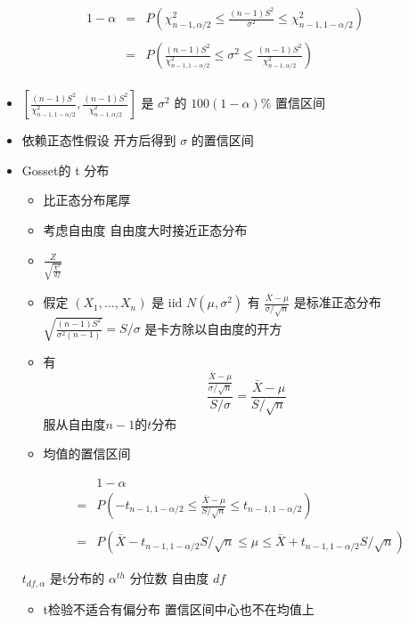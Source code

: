 \documentclass[]{book}
\providecommand{\tightlist}{%
  \setlength{\itemsep}{0pt}\setlength{\parskip}{0pt}}
\begin{document}
\begin{eqnarray*}
  1 - \alpha & = & P \left( \chi^2_{n-1, \alpha/2} \leq  \frac{(n - 1) S^2}{\sigma^2} \leq  \chi^2_{n-1,1 - \alpha/2} \right) \\ \\
& = &  P\left(\frac{(n-1)S^2}{\chi^2_{n-1,1-\alpha/2}} \leq \sigma^2 \leq 
\frac{(n-1)S^2}{\chi^2_{n-1,\alpha/2}} \right) \\
\end{eqnarray*}

\begin{itemize}
\tightlist
\item
  \(\left[\frac{(n-1)S^2}{\chi^2_{n-1,1-\alpha/2}}, \frac{(n-1)S^2}{\chi^2_{n-1,\alpha/2}}\right]\) 是 \(\sigma^2\) 的 \(100(1-\alpha)\%\) 置信区间
\item
  依赖正态性假设 开方后得到 \(\sigma\) 的置信区间
\item
  Gosset的 t 分布

  \begin{itemize}
  \tightlist
  \item
    比正态分布尾厚
  \item
    考虑自由度 自由度大时接近正态分布
  \item
    \(\frac{Z}{\sqrt{\frac{\chi^2}{df}}}\)
  \item
    假定 \((X_1,\ldots,X_n)\) 是 iid \(N(\mu,\sigma^2)\) 有 \(\frac{\bar X - \mu}{\sigma / \sqrt{n}}\) 是标准正态分布 \(\sqrt{\frac{(n - 1) S^2}{\sigma^2 (n - 1)}} = S / \sigma\) 是卡方除以自由度的开方
  \item
    有
    \[
    \frac{\frac{\bar X - \mu}{\sigma /\sqrt{n}}}{S/\sigma}  
    = \frac{\bar X - \mu}{S/\sqrt{n}}
    \]
    服从自由度\(n-1\)的\(t\)分布
  \item
    均值的置信区间
  \end{itemize}

  \begin{eqnarray*}
  &   & 1 - \alpha \\
  & = & P\left(-t_{n-1,1-\alpha/2} \leq \frac{\bar X - \mu}{S/\sqrt{n}} \leq t_{n-1,1-\alpha/2}\right) \\ \\
  & = & P\left(\bar X - t_{n-1,1-\alpha/2} S / \sqrt{n} \leq \mu  
      \leq \bar X + t_{n-1,1-\alpha/2}S /\sqrt{n}\right)
  \end{eqnarray*}

  \(t_{df,\alpha}\) 是t分布的 \(\alpha^{th}\) 分位数 自由度 \(df\)

  \begin{itemize}
  \tightlist
  \item
    t检验不适合有偏分布 置信区间中心也不在均值上
  \end{itemize}
\end{itemize}
\end{document}
